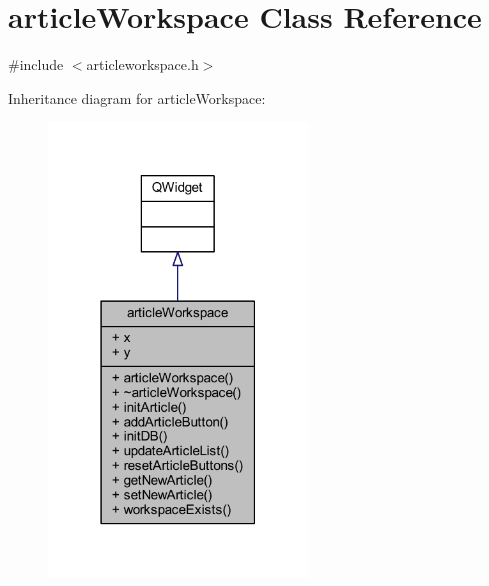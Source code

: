 \hypertarget{classarticle_workspace}{}\section{article\+Workspace Class Reference}
\label{classarticle_workspace}


{\ttfamily \#include $<$articleworkspace.\+h$>$}



Inheritance diagram for article\+Workspace\+:
\nopagebreak
\begin{figure}[H]
\begin{center}
\leavevmode
\includegraphics[width=195pt]{classarticle_workspace__inherit__graph}
\end{center}
\end{figure}


